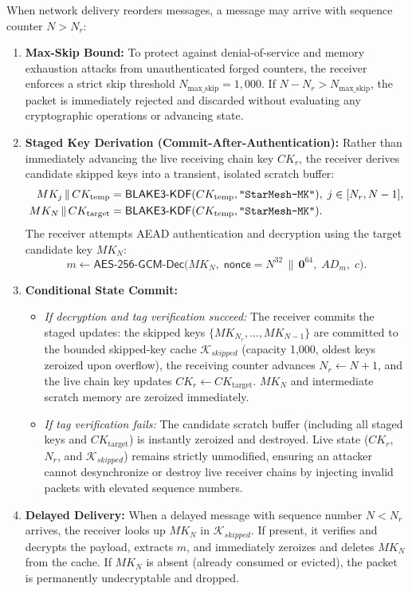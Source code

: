 \documentclass[11pt,a4paper]{article}
\theoremstyle{remark}
\theoremstyle{plain}
\newcommand{\strlit}[1]{\text{\upshape\texttt{"#1"}}}
\begin{document}
When network delivery reorders messages, a message may arrive with sequence counter $N > N_r$:
\begin{enumerate}
  \item \textbf{Max-Skip Bound:} To protect against denial-of-service and memory exhaustion attacks
        from unauthenticated forged counters, the receiver enforces a strict skip threshold
        $N_{\mathrm{max\_skip}} = 1{,}000$.  If $N - N_r > N_{\mathrm{max\_skip}}$, the packet is
        immediately rejected and discarded without evaluating any cryptographic operations or advancing state.
  \item \textbf{Staged Key Derivation (Commit-After-Authentication):} Rather than immediately advancing
        the live receiving chain key $CK_r$, the receiver derives candidate skipped keys into a transient,
        isolated scratch buffer:
        \begin{align*}
          MK_j \,\|\, CK_{\mathrm{temp}} &= \mathsf{BLAKE3\text{-}KDF}(CK_{\mathrm{temp}}, \strlit{StarMesh-MK}), \; j \in [N_r, N-1], \\
          MK_N \,\|\, CK_{\mathrm{target}} &= \mathsf{BLAKE3\text{-}KDF}(CK_{\mathrm{temp}}, \strlit{StarMesh-MK}).
        \end{align*}
        The receiver attempts AEAD authentication and decryption using the target candidate key $MK_N$:
        \[
          m \gets \mathsf{AES\text{-}256\text{-}GCM}\text{-}\mathsf{Dec}\bigl(MK_N,\; \mathsf{nonce} = N^{32} \,\|\, \mathbf{0}^{64},\; AD_m,\; c\bigr).
        \]
  \item \textbf{Conditional State Commit:}
        \begin{itemize}
          \item \textit{If decryption and tag verification succeed:} The receiver commits the staged updates:
                the skipped keys $\{MK_{N_r}, \dots, MK_{N-1}\}$ are committed to the bounded skipped-key cache
                $\mathcal{K}_{skipped}$ (capacity 1{,}000, oldest keys zeroized upon overflow), the receiving
                counter advances $N_r \leftarrow N + 1$, and the live chain key updates $CK_r \leftarrow CK_{\mathrm{target}}$.
                $MK_N$ and intermediate scratch memory are zeroized immediately.
          \item \textit{If tag verification fails:} The candidate scratch buffer (including all staged keys and
                $CK_{\mathrm{target}}$) is instantly zeroized and destroyed.  Live state ($CK_r$, $N_r$, and
                $\mathcal{K}_{skipped}$) remains strictly unmodified, ensuring an attacker cannot desynchronize
                or destroy live receiver chains by injecting invalid packets with elevated sequence numbers.
        \end{itemize}
  \item \textbf{Delayed Delivery:} When a delayed message with sequence number $N < N_r$ arrives, the receiver
        looks up $MK_N$ in $\mathcal{K}_{skipped}$.  If present, it verifies and decrypts the payload, extracts $m$,
        and immediately zeroizes and deletes $MK_N$ from the cache.  If $MK_N$ is absent (already consumed or evicted),
        the packet is permanently undecryptable and dropped.
\end{enumerate}
\end{document}
